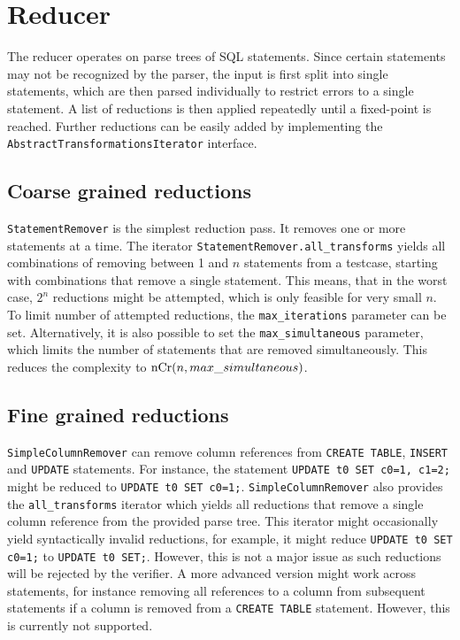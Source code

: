 \section{Reducer}
The reducer operates on parse trees of SQL statements. Since certain statements may not be recognized by the parser, the input is first split into single statements, which are then parsed individually to restrict errors to a single statement. A list of reductions is then applied repeatedly until a fixed-point is reached. Further reductions can be easily added by implementing the 
\texttt{AbstractTransformationsIterator} interface.

\subsection{Coarse grained reductions}

\texttt{StatementRemover} is the simplest reduction pass. It removes one or more statements at a time. The iterator \texttt{StatementRemover.all\_transforms} yields all combinations of removing between 1 and $n$ statements from a testcase, starting with combinations that remove a single statement. This means, that in the worst case, $2^n$ reductions might be attempted, which is only feasible for very small $n$. To limit number of attempted reductions, the \texttt{max\_iterations} parameter can be set. Alternatively, it is also possible to set the \texttt{max\_simultaneous} parameter, which limits the number of statements that are removed simultaneously. This reduces the complexity to $\textnormal{nCr}(n, max\_simultaneous)$.

\subsection{Fine grained reductions}
\texttt{SimpleColumnRemover} can remove column references from \texttt{CREATE TABLE}, \texttt{INSERT} and \texttt{UPDATE} statements. For instance, the statement \texttt{UPDATE t0 SET c0=1, c1=2;} might be reduced to \texttt{UPDATE t0 SET c0=1;}. \texttt{SimpleColumnRemover} also provides the \texttt{all\_transforms} iterator which yields all reductions that remove a single column reference from the provided parse tree. This iterator might occasionally yield syntactically invalid reductions, for example, it might reduce \texttt{UPDATE t0 SET c0=1;} to \texttt{UPDATE t0 SET;}. However, this is not a major issue as such reductions will be rejected by the verifier.
A more advanced version might work across statements, for instance removing all references to a column from subsequent statements if a column is removed from a \texttt{CREATE TABLE} statement. However, this is currently not supported.

